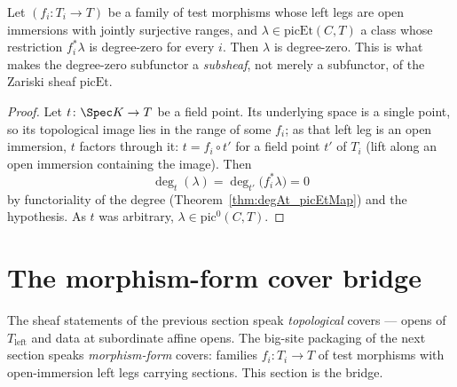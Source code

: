 \begin{theorem}
  \label{thm:mem_pic0Subgroup_of_cover}
  \leanok
  Let \((f_i \colon T_i \to T)\) be a family of test morphisms whose left legs are open
  immersions with jointly surjective ranges, and \(\lambda \in \mathrm{picEt}(C,T)\) a class
  whose restriction \(f_i^{*}\lambda\) is degree-zero for every \(i\). Then \(\lambda\) is
  degree-zero. This is what makes the degree-zero subfunctor a \emph{subsheaf}, not merely a
  subfunctor, of the Zariski sheaf \(\mathrm{picEt}\).
\end{theorem}
\begin{proof}
  \leanok
  Let \(t \colon \Spec K \to T\) be a field point. Its underlying space is a single point,
  so its topological image lies in the range of some \(f_i\); as that left leg is an open
  immersion, \(t\) factors through it: \(t = f_i \circ t'\) for a field point \(t'\) of
  \(T_i\) (lift along an open immersion containing the image). Then
  \[
    \deg_t(\lambda) = \deg_{t'}\bigl(f_i^{*}\lambda\bigr) = 0
  \]
  by functoriality of the degree (Theorem~\ref{thm:degAt_picEtMap}) and the hypothesis. As
  \(t\) was arbitrary, \(\lambda \in \mathrm{pic}^0(C,T)\).
\end{proof}

\section{The morphism-form cover bridge}
\label{sec:coverBridge}

The sheaf statements of the previous section speak \emph{topological} covers — opens of
\(T_{\mathrm{left}}\) and data at subordinate affine opens. The big-site packaging of the
next section speaks \emph{morphism-form} covers: families \(f_i \colon T_i \to T\) of test
morphisms with open-immersion left legs carrying sections. This section is the bridge.

